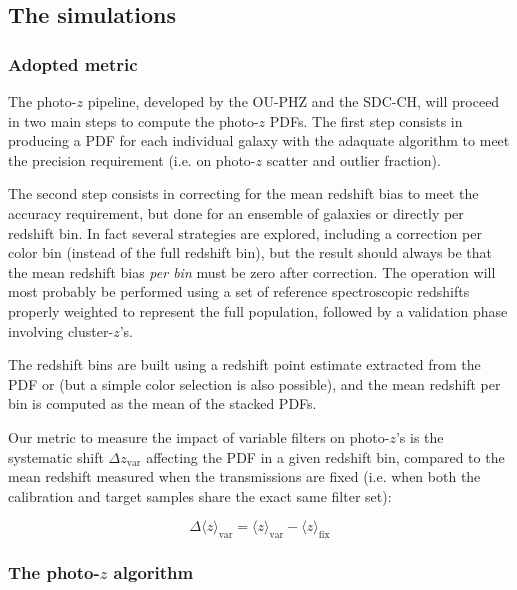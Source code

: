 \documentclass[11pt]{article}
\begin{document}
    \subsection{The simulations}\label{the-simulations}

\subsubsection{Adopted metric}\label{adopted-metric}

The photo-\(z\) pipeline, developed by the OU-PHZ and the SDC-CH, will
proceed in two main steps to compute the photo-\(z\) PDFs. The first
step consists in producing a PDF for each individual galaxy with the
adaquate algorithm to meet the precision requirement (i.e. on
photo-\(z\) scatter and outlier fraction).

The second step consists in correcting for the mean redshift bias to
meet the accuracy requirement, but done for an ensemble of galaxies or
directly per redshift bin. In fact several strategies are explored,
including a correction per color bin (instead of the full redshift bin),
but the result should always be that the mean redshift bias \emph{per
bin} must be zero after correction. The operation will most probably be
performed using a set of reference spectroscopic redshifts properly
weighted to represent the full population, followed by a validation
phase involving cluster-\(z\)'s.

The redshift bins are built using a redshift point estimate extracted
from the PDF or (but a simple color selection is also possible), and the
mean redshift per bin is computed as the mean of the stacked PDFs.

Our metric to measure the impact of variable filters on photo-\(z\)'s is
the systematic shift \(\Delta z_\mathrm{var}\) affecting the PDF in a
given redshift bin, compared to the mean redshift measured when the
transmissions are fixed (i.e. when both the calibration and target
samples share the exact same filter set):

    \begin{equation}
\Delta \langle z \rangle _\mathrm{var} = \langle z \rangle_\mathrm{var}- \langle z \rangle_\mathrm{fix}
\end{equation}

    \subsubsection{\texorpdfstring{The photo-\(z\)
algorithm}{The photo-z algorithm}}\label{the-photo-z-algorithm}
\end{document}
